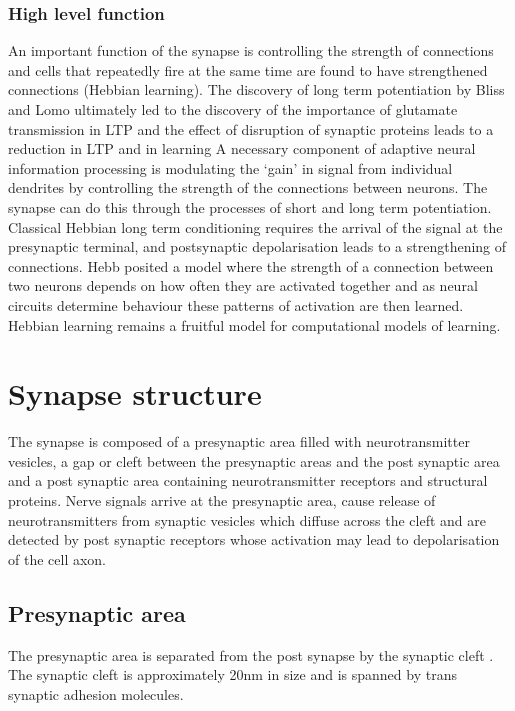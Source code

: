 \subsubsection{High level function}

An important function of the synapse is controlling the strength of connections and cells that repeatedly fire at the same time are found to have strengthened connections (Hebbian learning)\cite{hebb1949organization_check}. The discovery of long term potentiation by Bliss and Lomo \cite{bliss1973long} ultimately led to the discovery of the importance of glutamate transmission in LTP and the effect of disruption of synaptic proteins leads to a reduction in LTP and in learning
A necessary component of adaptive neural information processing is modulating the ‘gain’ in signal from individual dendrites by controlling the strength of the connections between neurons. The synapse can do this through the processes of short and long term potentiation. Classical Hebbian \cite{hebb1949organization_check} long term conditioning requires the arrival of the signal at the presynaptic terminal, and postsynaptic depolarisation leads to a strengthening of connections.   Hebb posited a model where the strength of a connection between two neurons depends on how often they are activated together and as neural circuits determine behaviour these patterns of activation are then learned. Hebbian learning remains a fruitful model for computational models of learning. 

\section{Synapse structure}
The synapse is composed of a presynaptic area filled with neurotransmitter vesicles, a gap or cleft between the presynaptic areas and the post synaptic area and a post synaptic area containing neurotransmitter receptors and structural proteins. Nerve signals arrive at the presynaptic area, cause release of neurotransmitters from synaptic vesicles which diffuse across the cleft and are detected by post synaptic receptors whose activation may lead to depolarisation of the cell axon. 


\subsection{Presynaptic area}
The presynaptic area is separated from the post synapse by the synaptic cleft \cite{rusakov2011shaping}.  The synaptic cleft is approximately 20nm in size \cite{zuber2005mammalian} and is spanned by trans synaptic adhesion molecules.  \cite{missler2012synaptic}


